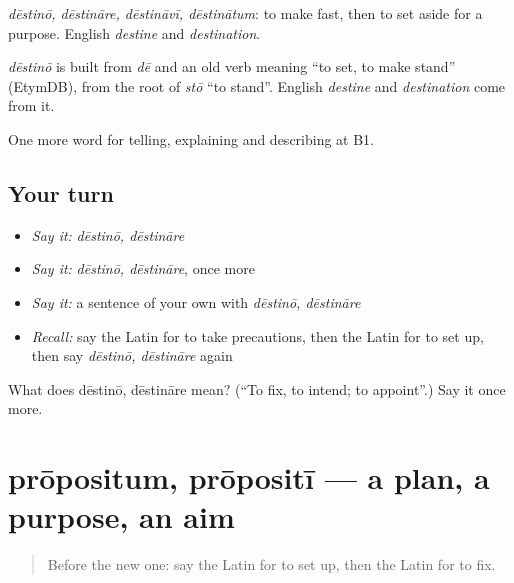 \emph{dēstinō, dēstināre, dēstināvī, dēstinātum}: to make fast, then to set aside for a purpose. English \emph{destine} and \emph{destination}.

\begin{cousinweb}
\emph{dēstinō} is built from \emph{dē} and an old verb meaning \textquotedblleft{}to set, to make stand\textquotedblright{} (EtymDB), from the root of \emph{stō} \textquotedblleft{}to stand\textquotedblright{}. English \emph{destine} and \emph{destination} come from it.
\end{cousinweb}

\begin{grammarlens}[title={What you've built}]
One more word for telling, explaining and describing at B1.
\end{grammarlens}

\subsection*{Your turn}
\begin{itemize}
\raggedright
  \item \emph{Say it:} \emph{dēstinō, dēstināre}
  \item \emph{Say it:} \emph{dēstinō, dēstināre}, once more
  \item \emph{Say it:} a sentence of your own with \emph{dēstinō, dēstināre}
  \item \emph{Recall:} say the Latin for to take precautions, then the Latin for to set up, then say \emph{dēstinō, dēstināre} again
\end{itemize}

\begin{tcolorbox}[breakable,colback=teal!4,colframe=teal!35!black,title={Before you move on}]
What does dēstinō, dēstināre mean? (\textquotedblleft{}To fix, to intend; to appoint\textquotedblright{}.) Say it once more.
\end{tcolorbox}
\section[prōpositum, prōpositī]{prōpositum, prōpositī — a plan, a purpose, an aim}

\label{lesson:LA-C393-propositum}



\begin{quote}
Before the new one: say the Latin for to set up, then the Latin for to fix.
\end{quote}

